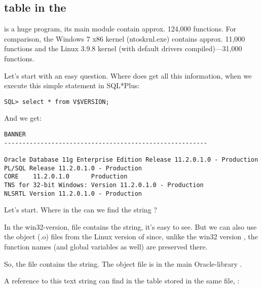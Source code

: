\subsection{ table in the \oracle}

\myindex{\oracle}
 is a huge program, its main module  contain approx. 124,000 functions. For comparison, the Windows 7 x86 kernel (ntoskrnl.exe) contains approx. 11,000 functions and the Linux 3.9.8 kernel
(with default drivers compiled)---31,000 functions.

Let's start with an easy question. Where does \oracle get all this information, when we execute this simple statement in SQL*Plus:

\begin{lstlisting}
SQL> select * from V$VERSION;
\end{lstlisting}

And we get:

\begin{lstlisting}
BANNER
--------------------------------------------------------

Oracle Database 11g Enterprise Edition Release 11.2.0.1.0 - Production
PL/SQL Release 11.2.0.1.0 - Production
CORE    11.2.0.1.0      Production
TNS for 32-bit Windows: Version 11.2.0.1.0 - Production
NLSRTL Version 11.2.0.1.0 - Production
\end{lstlisting}

Let's start. Where in the \oracle can we find the string ?

In the win32-version,  file contains the string,
it's easy to see.
But we can also use the object (.o) files from the Linux version of \oracle since, unlike the win32 version , the function names (and global variables as well) are preserved there.

So, the  file contains the  string.
The object file is in the main Oracle-library .

A reference to this text string can find in the  table stored in the same file, :

